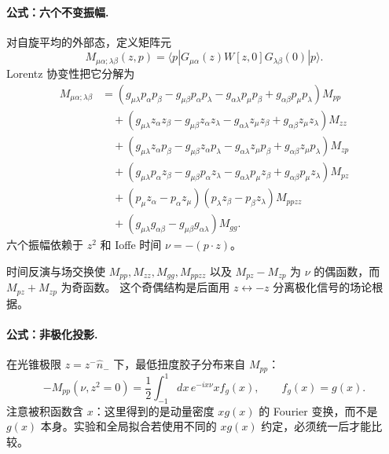 \paragraph{公式：六个不变振幅.}
对自旋平均的外部态，定义矩阵元
\begin{equation}
  M_{\mu\alpha;\lambda\beta}(z,p)
  =\langle p|G_{\mu\alpha}(z)W[z,0]G_{\lambda\beta}(0)|p\rangle .
  \label{eq:b05-bare-matrix}
\end{equation}
Lorentz 协变性把它分解为
\begin{align}
  M_{\mu\alpha;\lambda\beta}
  &=(g_{\mu\lambda}p_\alpha p_\beta
    -g_{\mu\beta}p_\alpha p_\lambda
    -g_{\alpha\lambda}p_\mu p_\beta
    +g_{\alpha\beta}p_\mu p_\lambda)M_{pp}\nonumber\\
  &\quad+(g_{\mu\lambda}z_\alpha z_\beta
    -g_{\mu\beta}z_\alpha z_\lambda
    -g_{\alpha\lambda}z_\mu z_\beta
    +g_{\alpha\beta}z_\mu z_\lambda)M_{zz}\nonumber\\
  &\quad+(g_{\mu\lambda}z_\alpha p_\beta
    -g_{\mu\beta}z_\alpha p_\lambda
    -g_{\alpha\lambda}z_\mu p_\beta
    +g_{\alpha\beta}z_\mu p_\lambda)M_{zp}\nonumber\\
  &\quad+(g_{\mu\lambda}p_\alpha z_\beta
    -g_{\mu\beta}p_\alpha z_\lambda
    -g_{\alpha\lambda}p_\mu z_\beta
    +g_{\alpha\beta}p_\mu z_\lambda)M_{pz}\nonumber\\
  &\quad+(p_\mu z_\alpha-p_\alpha z_\mu)
         (p_\lambda z_\beta-p_\beta z_\lambda)M_{ppzz}\nonumber\\
  &\quad+(g_{\mu\lambda}g_{\alpha\beta}
    -g_{\mu\beta}g_{\alpha\lambda})M_{gg}.
  \label{eq:b05-six-amplitudes}
\end{align}
六个振幅依赖于 \(z^2\) 和 Ioffe 时间 \(\nu=-(p\cdot z)\)。

时间反演与场交换使 \(M_{pp},M_{zz},M_{gg},M_{ppzz}\) 以及
\(M_{pz}-M_{zp}\) 为 \(\nu\) 的偶函数，而 \(M_{pz}+M_{zp}\) 为奇函数。
这个奇偶结构是后面用 \(z\leftrightarrow -z\) 分离极化信号的场论根据。

\paragraph{公式：非极化投影.}
在光锥极限 \(z=z^-\hat n_-\) 下，最低扭度胶子分布来自 \(M_{pp}\)：
\begin{equation}
  -M_{pp}(\nu,z^2=0)
  =\frac12\int_{-1}^{1}dx\,e^{-ix\nu}x f_g(x),
  \qquad f_g(x)=g(x).
  \label{eq:b05-mpp-to-pdf}
\end{equation}
注意被积函数含 \(x\)：这里得到的是动量密度 \(xg(x)\) 的 Fourier 变换，而不是 \(g(x)\) 本身。实验和全局拟合若使用不同的 \(xg(x)\) 约定，必须统一后才能比较。

